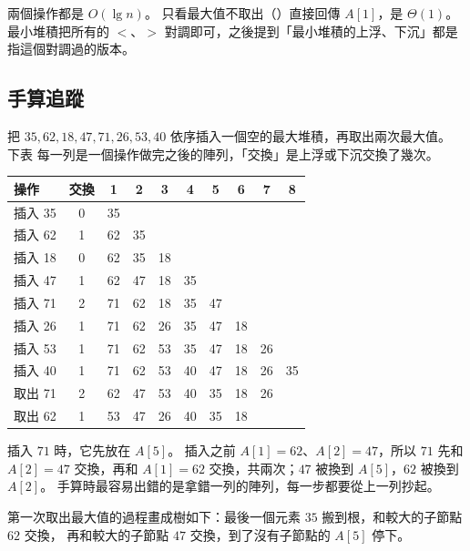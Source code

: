 兩個操作都是 $O(\lg n)$。 只看最大值不取出（）直接回傳 $A[1]$，是
$\Theta(1)$。 最小堆積把所有的 $<$、$>$ 對調即可，之後提到「最小堆積的上浮、下沉」都是
指這個對調過的版本。

\subsection{手算追蹤}
\label{sec:hp-trace}

把 $35, 62, 18, 47, 71, 26, 53, 40$ 依序插入一個空的最大堆積，再取出兩次最大值。 下表
每一列是一個操作做完之後的陣列，「交換」是上浮或下沉交換了幾次。

\begin{center}
\begin{tabular}{lc*{8}{c}}
\toprule
操作 & 交換 & 1 & 2 & 3 & 4 & 5 & 6 & 7 & 8 \\
\midrule
插入 35 & 0 & 35 \\
插入 62 & 1 & 62 & 35 \\
插入 18 & 0 & 62 & 35 & 18 \\
插入 47 & 1 & 62 & 47 & 18 & 35 \\
插入 71 & 2 & 71 & 62 & 18 & 35 & 47 \\
插入 26 & 1 & 71 & 62 & 26 & 35 & 47 & 18 \\
插入 53 & 1 & 71 & 62 & 53 & 35 & 47 & 18 & 26 \\
插入 40 & 1 & 71 & 62 & 53 & 40 & 47 & 18 & 26 & 35 \\
\midrule
取出 71 & 2 & 62 & 47 & 53 & 40 & 35 & 18 & 26 \\
取出 62 & 1 & 53 & 47 & 26 & 40 & 35 & 18 \\
\bottomrule
\end{tabular}
\end{center}

插入 $71$ 時，它先放在 $A[5]$。 插入之前 $A[1] = 62$、$A[2] = 47$，所以 $71$ 先和
$A[2] = 47$ 交換，再和 $A[1] = 62$ 交換，共兩次；$47$ 被換到 $A[5]$，$62$ 被換到 $A[2]$。
手算時最容易出錯的是拿錯一列的陣列，每一步都要從上一列抄起。

第一次取出最大值的過程畫成樹如下：最後一個元素 $35$ 搬到根，和較大的子節點 $62$ 交換，
再和較大的子節點 $47$ 交換，到了沒有子節點的 $A[5]$ 停下。

\begin{center}
\label{fig:hp-extract}
\end{center}

